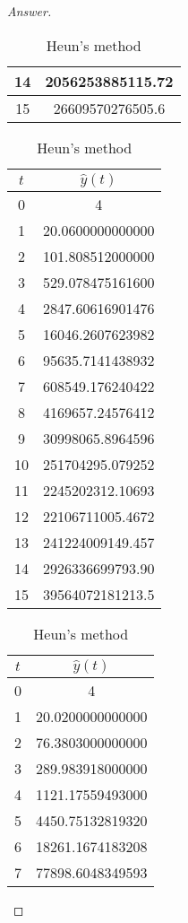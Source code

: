 \begin{proof}[Answer]
\begin{table}[H]
\begin{table}[htbp]
\begin{subtable}[t]{0.32\textwidth}
\begin{tabular}[t]{|c|c|}
		14	&	2056253885115.72	\\	\hline
		15	&	26609570276505.6	\\	\hline
		\end{tabular}
		\caption{2\(^\text{nd}\) order Taylor's method}
	\end{subtable}
	\begin{subtable}[t]{0.32\textwidth}
		\centering
		\begin{tabular}[t]{|c|c|}
		\hline
		\(t\)	&	\(\hat{y}(t)\)	\\	\hline
		0	&	4					\\	\hline
		1	&	20.0600000000000	\\	\hline
		2	&	101.808512000000	\\	\hline
		3	&	529.078475161600	\\	\hline
		4	&	2847.60616901476	\\	\hline
		5	&	16046.2607623982	\\	\hline
		6	&	95635.7141438932	\\	\hline
		7	&	608549.176240422	\\	\hline
		8	&	4169657.24576412	\\	\hline
		9	&	30998065.8964596	\\	\hline
		10	&	251704295.079252	\\	\hline
		11	&	2245202312.10693	\\	\hline
		12	&	22106711005.4672	\\	\hline
		13	&	241224009149.457	\\	\hline
		14	&	2926336699793.90	\\	\hline
		15	&	39564072181213.5	\\	\hline
		\end{tabular}
		\caption{Heun's method}
	\end{subtable}
	\begin{subtable}[t]{0.32\textwidth}
		\centering
		\begin{tabular}[t]{|c|c|}
		\hline
		\(t\)	&	\(\hat{y}(t)\)	\\	\hline
		0	&	4					\\	\hline
		1	&	20.0200000000000	\\	\hline
		2	&	76.3803000000000	\\	\hline
		3	&	289.983918000000	\\	\hline
		4	&	1121.17559493000	\\	\hline
		5	&	4450.75132819320	\\	\hline
		6	&	18261.1674183208	\\	\hline
		7	&	77898.6048349593	\\	\hline

\end{tabular}
\end{subtable}
\end{table}
\end{table}
\end{proof}
